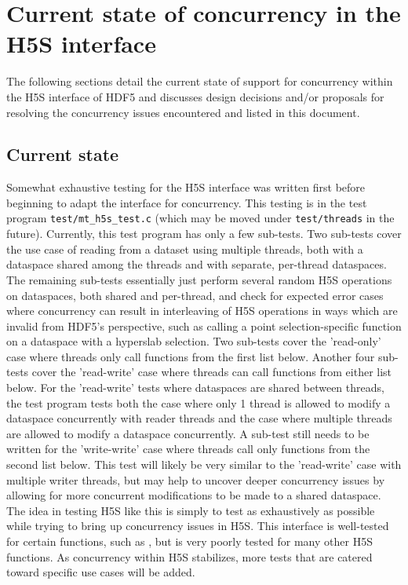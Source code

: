 \documentclass[../HDF5_RFC.tex]{subfiles}
\begin{document}
\section{Current state of concurrency in the H5S interface}
\label{h5s_concurrency_current_state}

The following sections detail the current state of support for concurrency within the H5S interface of
HDF5 and discusses design decisions and/or proposals for resolving the concurrency issues encountered and listed in this document.

\subsection{Current state}

Somewhat exhaustive testing for the H5S interface was written first before beginning to adapt the interface
for concurrency. This testing is in the test program \texttt{test/mt\_h5s\_test.c} (which may be moved
under \texttt{test/threads} in the future). Currently, this test program has only a few sub-tests. Two
sub-tests cover the use case of reading from a dataset using multiple threads, both with a dataspace
shared among the threads and with separate, per-thread dataspaces. The remaining sub-tests essentially
just perform several random H5S operations on dataspaces, both shared and per-thread, and check for
expected error cases where concurrency can result in interleaving of H5S operations in ways which are
invalid from HDF5's perspective, such as calling a point selection-specific function on a dataspace with
a hyperslab selection. Two sub-tests cover the 'read-only' case where threads only call functions from
the first list below. Another four sub-tests cover the 'read-write' case where threads can call functions
from either list below. For the 'read-write' tests where dataspaces are shared between threads, the test
program tests both the case where only 1 thread is allowed to modify a dataspace concurrently with reader
threads and the case where multiple threads are allowed to modify a dataspace concurrently. A sub-test still
needs to be written for the 'write-write' case where threads call only functions from the second list below.
This test will likely be very similar to the 'read-write' case with multiple writer threads, but may help
to uncover deeper concurrency issues by allowing for more concurrent modifications to be made to a shared
dataspace. The idea in testing H5S like this is simply to test as exhaustively as possible while trying to
bring up concurrency issues in H5S. This interface is well-tested for certain functions, such as
, but is very poorly tested for many other H5S functions.
As concurrency within H5S stabilizes, more tests that are catered toward specific use cases will be
added.
\end{document}
